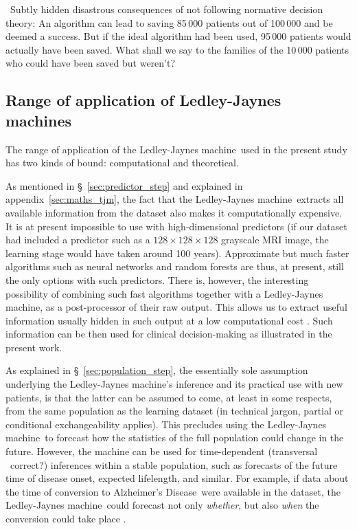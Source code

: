 \documentclass[utf8]{FrontiersinHarvard} %
\newcommand*{\puzzle}{{\fontencoding{U}\fontfamily{fontawesometwo}\selectfont\symbol{225}}}
\newcommand*{\pencil}{{\fontencoding{U}\fontfamily{fontawesometwo}\selectfont\symbol{210}}}
\newcommand{\mynotep}[1]{{\color{notecolour}\pencil\ #1}}
\newcommand{\mynotez}[1]{{\color{notecolour}\puzzle\ #1}}
\newcommand*{\sect}{\S}%
\newcommand*{\eg}{{e.g.}}
\newcommand*{\cf}{{cf.}}
\renewcommand*{\|}[1][]{\nonscript\:#1\vert\nonscript\:\mathopen{}}
\newcommand*{\ad}{Alzheimer's Disease}
\newcommand*{\ljm}{Ledley-Jaynes machine}
\begin{document}
\mynotep{Subtly hidden disastrous consequences of not following normative decision theory: An algorithm can lead to saving 85\,000 patients out of 100\,000 and be deemed a success. But if the ideal algorithm had been used, 95\,000 patients would actually have been saved. What shall we say to the families of the 10\,000 patients who could have been saved but weren't?}

\subsection{Range of application of \ljm s}
\label{sec:rangeLJM}

The range of application of the \ljm\ used in the present study has two kinds of bound: computational and theoretical.

As mentioned in \sect~\ref{sec:predictor_step} and explained in appendix~\ref{sec:maths_tjm}, the fact that the \ljm\ extracts all available information from the dataset also makes it computationally expensive. It is at present impossible to use with high-dimensional predictors (if our dataset had included a predictor such as a $128\times128\times128$ grayscale MRI image, the learning stage would have taken around 100 years). Approximate but much faster algorithms such as neural networks and random forests are thus, at present, still the only options with such predictors. There is, however, the interesting possibility of combining such fast algorithms together with a \ljm, as a post-processor of their raw output. This allows us to extract useful information usually hidden in such output at a low computational cost \citep{dyrlandetal2022b}. Such information can be then used for clinical decision-making as illustrated in the present work.

As explained in \sect~\ref{sec:population_step}, the essentially sole assumption underlying the \ljm's inference and its practical use with new patients, is that the latter can be assumed to come, at least in some respects, from the same population as the learning dataset (in technical jargon, partial or conditional exchangeability applies). This precludes using the \ljm\ to forecast how the statistics of the full population could change in the future. However, the machine can be used for time-dependent (transversal \mynotez{correct?}) inferences within a stable population, such as forecasts of the future time of disease onset, expected lifelength, and similar. For example, if data about the time of conversion to \ad\ were available in the dataset, the \ljm\ could forecast not only \emph{whether}, but also \emph{when} the conversion could take place \citep[\cf\ \eg][]{delacruzmesiaetal2007}.
\end{document}
